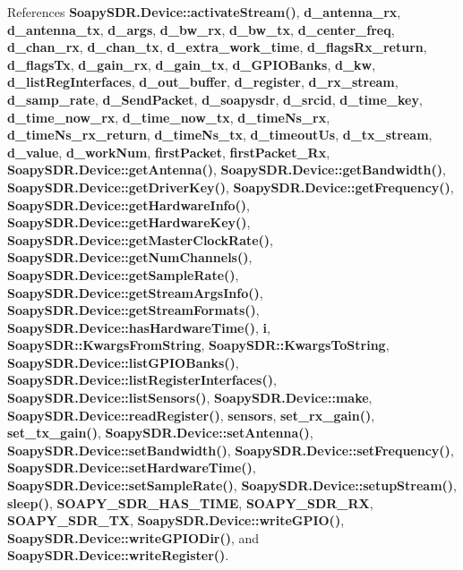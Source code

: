 References {\bf Soapy\+S\+D\+R.\+Device\+::activate\+Stream()}, {\bf d\+\_\+antenna\+\_\+rx}, {\bf d\+\_\+antenna\+\_\+tx}, {\bf d\+\_\+args}, {\bf d\+\_\+bw\+\_\+rx}, {\bf d\+\_\+bw\+\_\+tx}, {\bf d\+\_\+center\+\_\+freq}, {\bf d\+\_\+chan\+\_\+rx}, {\bf d\+\_\+chan\+\_\+tx}, {\bf d\+\_\+extra\+\_\+work\+\_\+time}, {\bf d\+\_\+flags\+Rx\+\_\+return}, {\bf d\+\_\+flags\+Tx}, {\bf d\+\_\+gain\+\_\+rx}, {\bf d\+\_\+gain\+\_\+tx}, {\bf d\+\_\+\+G\+P\+I\+O\+Banks}, {\bf d\+\_\+kw}, {\bf d\+\_\+list\+Reg\+Interfaces}, {\bf d\+\_\+out\+\_\+buffer}, {\bf d\+\_\+register}, {\bf d\+\_\+rx\+\_\+stream}, {\bf d\+\_\+samp\+\_\+rate}, {\bf d\+\_\+\+Send\+Packet}, {\bf d\+\_\+soapysdr}, {\bf d\+\_\+srcid}, {\bf d\+\_\+time\+\_\+key}, {\bf d\+\_\+time\+\_\+now\+\_\+rx}, {\bf d\+\_\+time\+\_\+now\+\_\+tx}, {\bf d\+\_\+time\+Ns\+\_\+rx}, {\bf d\+\_\+time\+Ns\+\_\+rx\+\_\+return}, {\bf d\+\_\+time\+Ns\+\_\+tx}, {\bf d\+\_\+timeout\+Us}, {\bf d\+\_\+tx\+\_\+stream}, {\bf d\+\_\+value}, {\bf d\+\_\+work\+Num}, {\bf first\+Packet}, {\bf first\+Packet\+\_\+\+Rx}, {\bf Soapy\+S\+D\+R.\+Device\+::get\+Antenna()}, {\bf Soapy\+S\+D\+R.\+Device\+::get\+Bandwidth()}, {\bf Soapy\+S\+D\+R.\+Device\+::get\+Driver\+Key()}, {\bf Soapy\+S\+D\+R.\+Device\+::get\+Frequency()}, {\bf Soapy\+S\+D\+R.\+Device\+::get\+Hardware\+Info()}, {\bf Soapy\+S\+D\+R.\+Device\+::get\+Hardware\+Key()}, {\bf Soapy\+S\+D\+R.\+Device\+::get\+Master\+Clock\+Rate()}, {\bf Soapy\+S\+D\+R.\+Device\+::get\+Num\+Channels()}, {\bf Soapy\+S\+D\+R.\+Device\+::get\+Sample\+Rate()}, {\bf Soapy\+S\+D\+R.\+Device\+::get\+Stream\+Args\+Info()}, {\bf Soapy\+S\+D\+R.\+Device\+::get\+Stream\+Formats()}, {\bf Soapy\+S\+D\+R.\+Device\+::has\+Hardware\+Time()}, {\bf i}, {\bf Soapy\+S\+D\+R\+::\+Kwargs\+From\+String}, {\bf Soapy\+S\+D\+R\+::\+Kwargs\+To\+String}, {\bf Soapy\+S\+D\+R.\+Device\+::list\+G\+P\+I\+O\+Banks()}, {\bf Soapy\+S\+D\+R.\+Device\+::list\+Register\+Interfaces()}, {\bf Soapy\+S\+D\+R.\+Device\+::list\+Sensors()}, {\bf Soapy\+S\+D\+R.\+Device\+::make}, {\bf Soapy\+S\+D\+R.\+Device\+::read\+Register()}, {\bf sensors}, {\bf set\+\_\+rx\+\_\+gain()}, {\bf set\+\_\+tx\+\_\+gain()}, {\bf Soapy\+S\+D\+R.\+Device\+::set\+Antenna()}, {\bf Soapy\+S\+D\+R.\+Device\+::set\+Bandwidth()}, {\bf Soapy\+S\+D\+R.\+Device\+::set\+Frequency()}, {\bf Soapy\+S\+D\+R.\+Device\+::set\+Hardware\+Time()}, {\bf Soapy\+S\+D\+R.\+Device\+::set\+Sample\+Rate()}, {\bf Soapy\+S\+D\+R.\+Device\+::setup\+Stream()}, {\bf sleep()}, {\bf S\+O\+A\+P\+Y\+\_\+\+S\+D\+R\+\_\+\+H\+A\+S\+\_\+\+T\+I\+ME}, {\bf S\+O\+A\+P\+Y\+\_\+\+S\+D\+R\+\_\+\+RX}, {\bf S\+O\+A\+P\+Y\+\_\+\+S\+D\+R\+\_\+\+TX}, {\bf Soapy\+S\+D\+R.\+Device\+::write\+G\+P\+I\+O()}, {\bf Soapy\+S\+D\+R.\+Device\+::write\+G\+P\+I\+O\+Dir()}, and {\bf Soapy\+S\+D\+R.\+Device\+::write\+Register()}.



